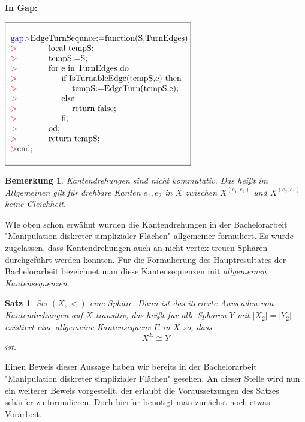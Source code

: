 \documentclass[12pt,titlepage,twoside,cleardoublepage]{article}
\theoremstyle{nummermitklammern}
\newtheorem{bemerkung}[temp]{Bemerkung}
\newtheorem{satz}[temp]{Satz}
\newtheorem{bemerkung}[zahl]{Bemerkung}
\newtheorem{satz}[zahl]{Satz}
\numberwithin{equation}{section}
\begin{document}
\textbf{In Gap:}
\begin{center}
$\fbox{
\parbox{14cm}{
\begin{tabbing}
\textcolor{blue}{gap$>$}Edge\=TurnSequnce:=function(S,TurnEdges)\\
\textcolor{red}{$>$}\> local tempS;\\
\textcolor{red}{$>$}\> tempS:=S;\\
\textcolor{red}{$>$}\> for \=e in TurnEdges do\\
\textcolor{red}{$>$}\>\> if I\=sTurnableEdge(tempS,e) then\\
\textcolor{red}{$>$}\>\>\> tempS:=EdgeTurn(tempS,e);\\
\textcolor{red}{$>$}\>\> else\\
\textcolor{red}{$>$}\>\>\> return false;\\
\textcolor{red}{$>$}\> \>fi;\\
\textcolor{red}{$>$}\> od;\\
\textcolor{red}{$>$}\> return tempS;\\
\textcolor{red}{$>$}end;
\end{tabbing}
}}$
\end{center}
\begin{bemerkung}
Kantendrehungen sind nicht kommutativ. Das heißt im Allgemeinen gilt für drehbare Kanten $e_1,e_2$ in $X$ zwischen $X^{(e_1,e_2)}$ und $X^{(e_2,e_1)}$ keine Gleichheit. 

\end{bemerkung}

WIe oben schon erwähnt wurden die Kantendrehungen in der Bachelorarbeit "Manipulation diskreter simplizialer Flächen" allgemeiner formuliert. Es wurde zugelassen, dass Kantendrehungen auch an nicht vertex-treuen Sphären durchgeführt werden konnten. Für die Formulierung des Hauptresultates der Bachelorarbeit bezeichnet man diese Kantensequenzen mit \emph{allgemeinen Kantensequenzen}.
\begin{satz}
Sei $(X,<)$ eine Sphäre. Dann ist das iterierte Anwenden von Kantendrehungen auf $X$ transitiv, 
 das heißt für alle Sphären $Y$ mit $\vert X_2\vert=\vert Y_2\vert$ existiert eine allgemeine Kantensequenz $E$ in $X$ so, dass 
\[
X^E \cong Y
\]
ist. 
\end{satz}
Einen Beweis dieser Aussage haben wir bereits in der Bachelorarbeit "Manipulation diskreter simplizialer Flächen"  gesehen. An dieser Stelle wird nun ein weiterer Beweis vorgestellt, der erlaubt die Voraussetzungen des Satzes schärfer zu formulieren. Doch hierfür benötigt man zunächst noch etwas Vorarbeit.
\end{document}
